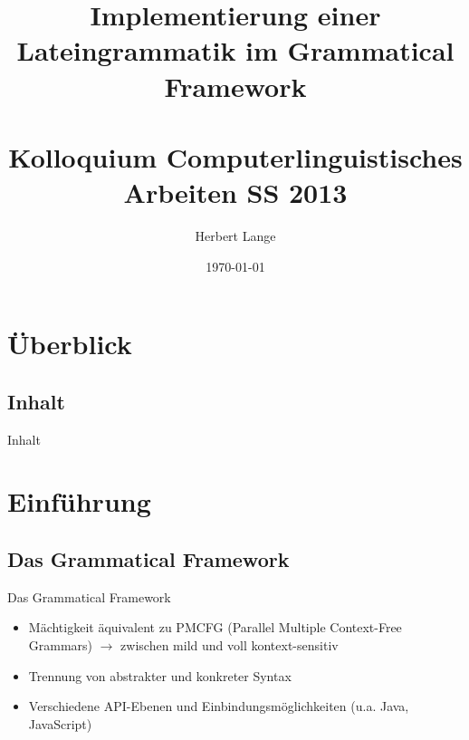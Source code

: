 \documentclass{beamer}
\title{Implementierung einer Lateingrammatik im Grammatical Framework \\ \quad \\ \large Kolloquium Computerlinguistisches Arbeiten SS 2013 }
\author{Herbert Lange}
\date{\today}
\begin{document}
\frame{\titlepage}

\section*{Überblick}
\subsection*{Inhalt}
\begin{frame}{Inhalt}
\tableofcontents
\end{frame}
\section{Einführung}
\subsection{Das Grammatical Framework}
\begin{frame}[fragile]{Das Grammatical Framework}
\begin{itemize}
\item Mächtigkeit äquivalent zu PMCFG (Parallel Multiple Context-Free Grammars)
$\rightarrow$ zwischen mild und voll kontext-sensitiv
\item Trennung von abstrakter und konkreter Syntax
\item Verschiedene API-Ebenen und Einbindungsmöglichkeiten (u.a. Java, JavaScript)
\end{itemize}
\end{frame}
\end{document}
